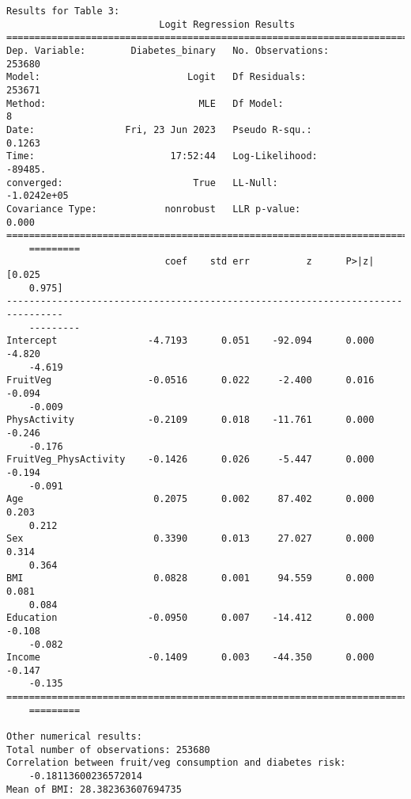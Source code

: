 \documentclass[11pt]{article}
\begin{document}
\begin{Verbatim}[tabsize=4]
Results for Table 3:
                           Logit Regression Results
==============================================================================
Dep. Variable:        Diabetes_binary   No. Observations:               253680
Model:                          Logit   Df Residuals:                   253671
Method:                           MLE   Df Model:                            8
Date:                Fri, 23 Jun 2023   Pseudo R-squ.:                  0.1263
Time:                        17:52:44   Log-Likelihood:                -89485.
converged:                       True   LL-Null:                   -1.0242e+05
Covariance Type:            nonrobust   LLR p-value:                     0.000
================================================================================
	=========
                            coef    std err          z      P>|z|      [0.025
	0.975]
--------------------------------------------------------------------------------
	---------
Intercept                -4.7193      0.051    -92.094      0.000      -4.820
	-4.619
FruitVeg                 -0.0516      0.022     -2.400      0.016      -0.094
	-0.009
PhysActivity             -0.2109      0.018    -11.761      0.000      -0.246
	-0.176
FruitVeg_PhysActivity    -0.1426      0.026     -5.447      0.000      -0.194
	-0.091
Age                       0.2075      0.002     87.402      0.000       0.203
	0.212
Sex                       0.3390      0.013     27.027      0.000       0.314
	0.364
BMI                       0.0828      0.001     94.559      0.000       0.081
	0.084
Education                -0.0950      0.007    -14.412      0.000      -0.108
	-0.082
Income                   -0.1409      0.003    -44.350      0.000      -0.147
	-0.135
================================================================================
	=========

Other numerical results:
Total number of observations: 253680
Correlation between fruit/veg consumption and diabetes risk:
	-0.18113600236572014
Mean of BMI: 28.382363607694735

\end{Verbatim}
\end{document}
